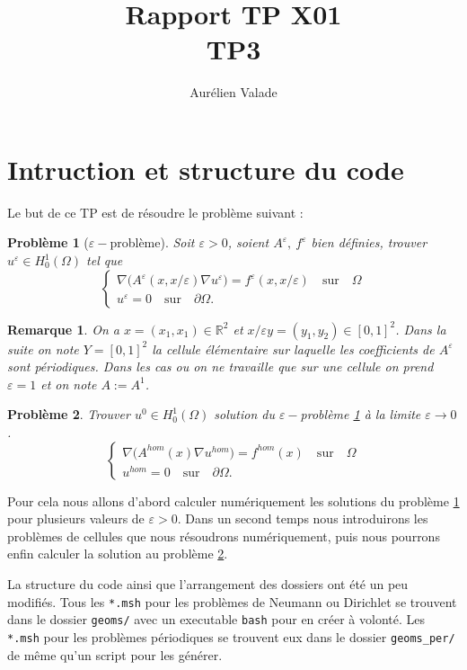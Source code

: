 \message{ !name(rapport.tex)}\documentclass[11pt]{article}
\title{Rapport TP X01 \\ TP3}
\author{Aurélien Valade}
\date{}
\newtheorem{pb}{Problème}
\newtheorem{rmq}{Remarque}
\newcommand{\R}{\mathbb{R}}
\newcommand{\Ah}{A^{hom}}
\newcommand{\uh}{u^{hom}}
\newcommand{\fh}{f^{hom}}
\begin{document}

\maketitle

\section{Intruction et structure du code}


Le but de ce TP est de résoudre le problème suivant :

\begin{pb}[$\varepsilon-$problème]
  \label{pb:eps}
  Soit $\varepsilon>0$, soient $A^\varepsilon, ~f^\varepsilon$ bien définies, trouver $u^\varepsilon\in H^1_0(\Omega)$ tel que  
  \[
    \begin{cases}
      \nabla \big(A^\varepsilon(x,x/\varepsilon) \nabla u^\varepsilon\big) = f^\varepsilon(x, x/\varepsilon) \quad \mbox{sur}\quad \Omega\\
      u^\varepsilon = 0 \quad \mbox{sur}\quad \partial\Omega.
    \end{cases}
  \]
\end{pb}
\begin{rmq}
  On a $x =(x_1, x_1) \in \R^2$  et $x/\varepsilon y = (y_1, y_2) \in [0,1]^2$. Dans la suite on note $Y=[0,1]^2$ la cellule élémentaire sur laquelle les coefficients de
  $A^\varepsilon$ sont périodiques. Dans les cas ou on ne travaille que sur une cellule on prend $\varepsilon=1$ et on note $A := A^1$. 
\end{rmq}
\begin{pb}
  \label{pb:hom}
  Trouver $u^0 \in H^1_0(\Omega)$ solution du $\varepsilon-$problème \ref{pb:eps} à la limite $\varepsilon\to 0 $.
  \[
    \begin{cases}
      \nabla \big(\Ah(x) \nabla \uh\big) = \fh(x) \quad \mbox{sur}\quad \Omega\\
      \uh= 0 \quad \mbox{sur}\quad \partial\Omega.
    \end{cases}
  \]
\end{pb}


Pour cela nous allons d'abord calculer numériquement les solutions du problème \ref{pb:eps} pour plusieurs valeurs de $\varepsilon>0$. Dans un second temps nous
introduirons les problèmes de cellules que nous résoudrons numériquement, puis nous pourrons enfin calculer la solution au problème \ref{pb:hom}.

La structure du code ainsi que l'arrangement des dossiers ont été un peu modifiés. Tous les \texttt{*.msh} pour les problèmes de Neumann ou Dirichlet se trouvent
dans le dossier \texttt{geoms/} avec un executable \texttt{bash} pour en créer à volonté. Les \texttt{*.msh} pour les problèmes périodiques se trouvent eux dans
le dossier \texttt{geoms\_per/} de même qu'un script pour les générer.
\end{document}
